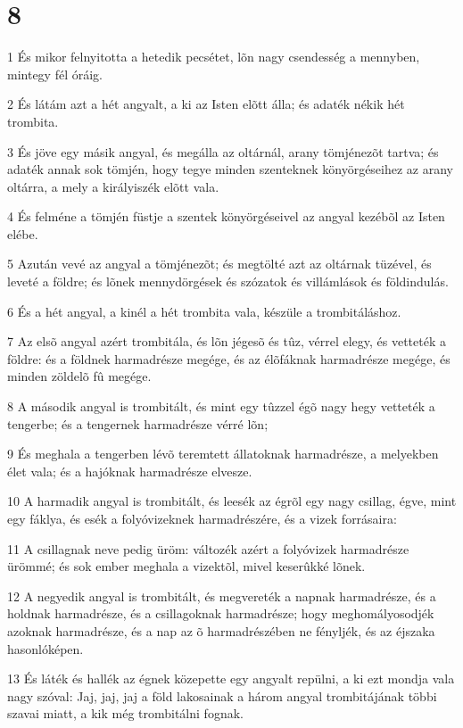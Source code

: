 \chapter{8}

\par 1 És mikor felnyitotta a hetedik pecsétet, lõn nagy csendesség a mennyben, mintegy fél óráig.
\par 2 És látám azt a hét angyalt, a ki az Isten elõtt álla; és adaték nékik hét trombita.
\par 3 És jöve egy másik angyal, és megálla az oltárnál, arany tömjénezõt tartva; és adaték annak sok tömjén, hogy tegye minden szenteknek könyörgéseihez az arany  oltárra, a mely a királyiszék elõtt vala.
\par 4 És felméne a tömjén füstje a szentek könyörgéseivel az angyal kezébõl az Isten elébe.
\par 5 Azután vevé az angyal a tömjénezõt; és megtölté azt az oltárnak tüzével, és leveté a földre; és lõnek mennydörgések és szózatok és villámlások és földindulás.
\par 6 És a hét angyal, a kinél a hét trombita vala, készüle a trombitáláshoz.
\par 7 Az elsõ angyal azért trombitála, és lõn jégesõ és tûz, vérrel elegy, és vetteték a földre: és a földnek harmadrésze megége, és az élõfáknak harmadrésze megége, és minden zöldelõ fû megége.
\par 8 A második angyal is trombitált, és mint egy tûzzel égõ nagy hegy vetteték a tengerbe; és a tengernek harmadrésze vérré lõn;
\par 9 És meghala a tengerben lévõ teremtett állatoknak harmadrésze, a melyekben élet vala; és a hajóknak harmadrésze elvesze.
\par 10 A harmadik angyal is trombitált, és leesék az égrõl egy nagy csillag, égve, mint egy fáklya, és esék a folyóvizeknek harmadrészére, és a vizek forrásaira:
\par 11 A csillagnak neve pedig üröm: változék azért a folyóvizek harmadrésze ürömmé; és sok ember meghala a vizektõl, mivel keserûkké lõnek.
\par 12 A negyedik angyal is trombitált, és megvereték a napnak harmadrésze, és a holdnak harmadrésze, és a csillagoknak harmadrésze; hogy meghomályosodjék azoknak harmadrésze, és a nap az õ harmadrészében ne fényljék, és az éjszaka hasonlóképen.
\par 13 És láték és hallék az égnek közepette egy angyalt repülni, a ki ezt mondja vala nagy szóval: Jaj, jaj, jaj a föld lakosainak a három angyal trombitájának többi szavai miatt, a kik még trombitálni fognak.

